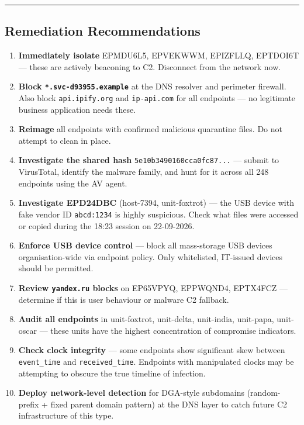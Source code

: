 \documentclass[
]{article}
\begin{document}
\begin{center}\rule{0.5\linewidth}{0.5pt}\end{center}

\subsection{Remediation
Recommendations}\label{remediation-recommendations}

\begin{enumerate}
\def\labelenumi{\arabic{enumi}.}
\item
  \textbf{Immediately isolate} EPMDU6L5, EPVEKWWM, EPIZFLLQ, EPTDOI6T
  --- these are actively beaconing to C2. Disconnect from the network
  now.
\item
  \textbf{Block \texttt{*.svc-d93955.example}} at the DNS resolver and
  perimeter firewall. Also block \texttt{api.ipify.org} and
  \texttt{ip-api.com} for all endpoints --- no legitimate business
  application needs these.
\item
  \textbf{Reimage} all endpoints with confirmed malicious quarantine
  files. Do not attempt to clean in place.
\item
  \textbf{Investigate the shared hash} \texttt{5e10b3490160cca0fc87...}
  --- submit to VirusTotal, identify the malware family, and hunt for it
  across all 248 endpoints using the AV agent.
\item
  \textbf{Investigate EPD24DBC} (host-7394, unit-foxtrot) --- the USB
  device with fake vendor ID \texttt{abcd:1234} is highly suspicious.
  Check what files were accessed or copied during the 18:23 session on
  22-09-2026.
\item
  \textbf{Enforce USB device control} --- block all mass-storage USB
  devices organisation-wide via endpoint policy. Only whitelisted,
  IT-issued devices should be permitted.
\item
  \textbf{Review \texttt{yandex.ru} blocks} on EP65VPYQ, EPPWQND4,
  EPTX4FCZ --- determine if this is user behaviour or malware C2
  fallback.
\item
  \textbf{Audit all endpoints} in unit-foxtrot, unit-delta, unit-india,
  unit-papa, unit-oscar --- these units have the highest concentration
  of compromise indicators.
\item
  \textbf{Check clock integrity} --- some endpoints show significant
  skew between \texttt{event\_time} and \texttt{received\_time}.
  Endpoints with manipulated clocks may be attempting to obscure the
  true timeline of infection.
\item
  \textbf{Deploy network-level detection} for DGA-style subdomains
  (random-prefix + fixed parent domain pattern) at the DNS layer to
  catch future C2 infrastructure of this type.
\end{enumerate}
\end{document}
